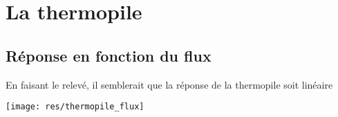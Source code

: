 \documentclass[12pt,a4paper]{article}
\begin{document}
	\section{La thermopile}
	\subsection{Réponse en fonction du flux}
	En faisant le relevé, il semblerait que la réponse de la thermopile soit linéaire%
	\begin{center}
		\texttt{[image: res/thermopile\_flux]}
	\end{center}
\end{document}
